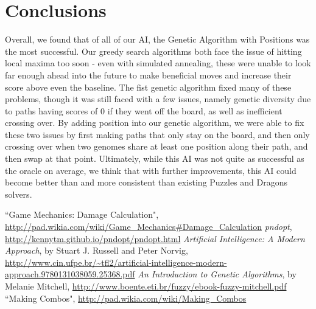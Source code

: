 \documentclass[journal,final,letterpaper,11pt]{IEEEtran}
\begin{document}
\section{Conclusions}
Overall, we found that of all of our AI, the Genetic Algorithm with Positions was the most successful. Our greedy search algorithms both face the issue of hitting local maxima too soon - even with simulated annealing, these were unable to look far enough ahead into the future to make beneficial moves and increase their score above even the baseline. The fist genetic algorithm fixed many of these problems, though it was still faced with a few issues, namely genetic diversity due to paths having scores of 0 if they went off the board, as well as inefficient crossing over. By adding position into our genetic algorithm, we were able to fix these two issues by first making paths that only stay on the board, and then only crossing over when two genomes share at least one position along their path, and then swap at that point. Ultimately, while this AI was not quite as successful as the oracle on average, we think that with further improvements, this AI could become better than and more consistent than existing Puzzles and Dragons solvers. 


\begin{thebibliography}{1}

 ``Game Mechanics: Damage Calculation", \url{http://pad.wikia.com/wiki/Game_Mechanics#Damage_Calculation}
 \textit{pndopt}, \url{http://kennytm.github.io/pndopt/pndopt.html}
 \textit{Artificial Intelligence: A Modern Approach}, by Stuart J. Russell and Peter Norvig,
\url{http://www.cin.ufpe.br/~tfl2/artificial-intelligence-modern-approach.9780131038059.25368.pdf}
 \textit{An Introduction to Genetic Algorithms}, by Melanie Mitchell,
\url{http://www.boente.eti.br/fuzzy/ebook-fuzzy-mitchell.pdf}
 ``Making Combos", \url{http://pad.wikia.com/wiki/Making_Combos}



\end{thebibliography}
\end{document}
